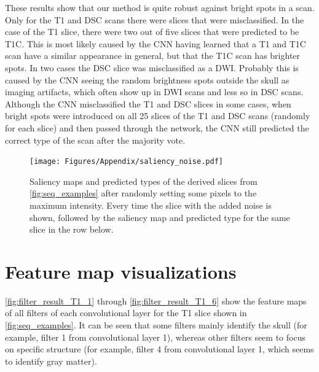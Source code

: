 \begin{subappendices}
These results show that our method is quite robust against bright spots in a \gls{scan}.
Only for the \gls{T1} and \gls{DSC} \glspl{scan} there were \glspl{slice} that were misclassified.
In the case of the \gls{T1} \gls{slice}, there were two out of five \glspl{slice} that were predicted to be \gls{T1C}.
This is most likely caused by the \gls{CNN} having learned that a \gls{T1} and \gls{T1C} \gls{scan} have a similar appearance in general, but that the \gls{T1C} \gls{scan} has brighter spots.
In two cases the \gls{DSC} \gls{slice} was misclassified as a \gls{DWI}.
Probably this is caused by the \gls{CNN} seeing the random brightness spots outside the skull as imaging artifacts, which often show up in \gls{DWI} \glspl{scan} and less so in \gls{DSC} \glspl{scan}.
Although the \gls{CNN} misclassified the \gls{T1} and \gls{DSC} \glspl{slice} in some cases, when bright spots were introduced on all 25 \glspl{slice} of the \gls{T1} and \gls{DSC} \glspl{scan} (randomly for each \gls{slice}) and then passed through the network, the \gls{CNN} still predicted the correct \gls{type} of the \gls{scan} after the majority vote.

\begin{figure}[ht]
    \centering
    \texttt{[image: Figures/Appendix/saliency\_noise.pdf]}
    \caption{Saliency maps and predicted \glspl{type} of the derived \glspl{slice} from \cref{fig:seq_examples} after randomly setting some pixels to the maximum intensity.
    Every time the \gls{slice} with the added noise is shown, followed by the saliency map and predicted \gls{type} for the same \gls{slice} in the row below.}
    \label{fig:bright_noise}
\end{figure}



\clearpage

\section{Feature map visualizations}
\label{app:filtervis}

\cref{fig:filter_result_T1_1} through \cref{fig:filter_result_T1_6} show the feature maps of all filters of each convolutional layer for the \gls{T1} \gls{slice} shown in \cref{fig:seq_examples}.
It can be seen that some filters mainly identify the skull (for example, filter 1 from convolutional layer 1), whereas other filters seem to focus on specific structure (for example, filter 4 from convolutional layer 1, which seems to identify gray matter).


\end{subappendices}
